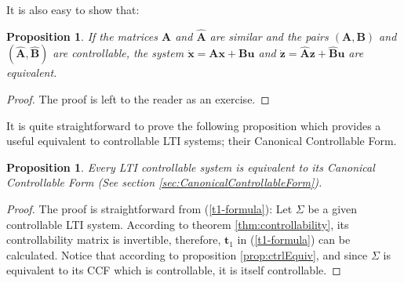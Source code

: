 \documentclass[a4paper,10pt,oneside]{book}
\newtheorem{proposition}[theorem]{Proposition}
\begin{document}
It is also easy to show that:
\begin{proposition}
 If the matrices $\mathbf{A}$ and $\hat{\mathbf{A}}$ are similar and the pairs $(\mathbf{A},\mathbf{B})$ and $(\hat{\mathbf{A}},\hat{\mathbf{B}})$ are controllable, the system $\dot{\mathbf{x}}=\mathbf{Ax}+\mathbf{Bu}$ and $\dot{\mathbf{z}}=\hat{\mathbf{A}}\mathbf{z}+\hat{\mathbf{B}}\mathbf{u}$ are equivalent.
\end{proposition}
\begin{proof}
 The proof is left to the reader as an exercise.
\end{proof}
It is quite straightforward to prove the following proposition which provides a useful equivalent to controllable LTI systems; their Canonical Controllable Form. 
\begin{proposition}\label{prop:descrCtrlSys}
 Every LTI controllable system is equivalent to its Canonical Controllable Form (See section \ref{sec:CanonicalControllableForm}).
\end{proposition}
\begin{proof}
 The proof is straightforward from (\ref{t1-formula}): Let $\Sigma$ be a given controllable LTI system. According to theorem \ref{thm:controllability}, its controllability matrix is invertible, therefore, $\mathbf{t}_1$ in (\ref{t1-formula}) can be calculated. Notice that according to proposition \ref{prop:ctrlEquiv}, and since $\Sigma$ is equivalent to its CCF which is controllable, it is itself controllable.
\end{proof}
\end{document}
